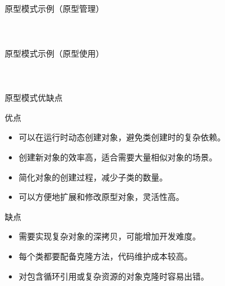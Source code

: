 \documentclass[UTF8,aspectratio=169]{beamer}
\begin{document}
\begin{frame}{原型模式示例（原型管理）}
    \begin{columns}
        \begin{column}{0.48\textwidth}
            \inputminted[firstline=200, lastline=212]{cpp}{code/prototype_pattern.cpp}
        \end{column}
        \begin{column}{0.48\textwidth}
            \inputminted[firstline=220, lastline=237]{cpp}{code/prototype_pattern.cpp}
        \end{column}
    \end{columns}
\end{frame}

\begin{frame}{原型模式示例（原型使用）}
    \begin{columns}
        \begin{column}{0.48\textwidth}
            \inputminted[firstline=239, lastline=254]{cpp}{code/prototype_pattern.cpp}
        \end{column}
        \begin{column}{0.48\textwidth}
            \inputminted[firstline=256, lastline=270]{cpp}{code/prototype_pattern.cpp}
        \end{column}
    \end{columns}
\end{frame}

\begin{frame}{原型模式优缺点}
    \begin{ytublock}{优点}
        \begin{itemize}
            \item 可以在运行时动态创建对象，避免类创建时的复杂依赖。
            \item 创建新对象的效率高，适合需要大量相似对象的场景。
            \item 简化对象的创建过程，减少子类的数量。
            \item 可以方便地扩展和修改原型对象，灵活性高。
        \end{itemize}
    \end{ytublock}
    \begin{alertytublock}{缺点}
        \begin{itemize}
            \item 需要实现复杂对象的深拷贝，可能增加开发难度。
            \item 每个类都要配备克隆方法，代码维护成本较高。
            \item 对包含循环引用或复杂资源的对象克隆时容易出错。
        \end{itemize}
    \end{alertytublock}
\end{frame}
\end{document}
